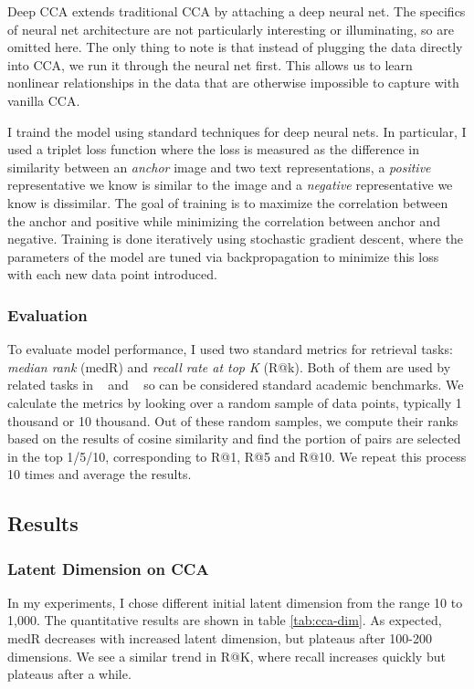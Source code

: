 \documentclass[12pt, titlepage]{article}
\begin{document}
Deep CCA extends traditional CCA by attaching a deep neural net. The specifics of neural net architecture are not particularly interesting or illuminating, so are omitted here. The only thing to note is that instead of plugging the data directly into CCA, we run it through the neural net first. This allows us to learn nonlinear relationships in the data that are otherwise impossible to capture with vanilla CCA.

I traind the model using standard techniques for deep neural nets. In particular, I used a triplet loss function where the loss is measured as the difference in similarity between an \textit{anchor} image and two text representations, a \textit{positive} representative we know is similar to the image and a \textit{negative} representative we know is dissimilar. The goal of training is to maximize the correlation between the anchor and positive while minimizing the correlation between anchor and negative. Training is done iteratively using stochastic gradient descent, where the parameters of the model are tuned via backpropagation to minimize this loss with each new data point introduced.

\subsubsection{Evaluation}
To evaluate model performance, I used two standard metrics for retrieval tasks: \textit{median rank} (medR) and \textit{recall rate at top K} (R@k). Both of them are used by related tasks in ~\cite{Recipe1M} and ~\cite{xmrs} so can be considered standard academic benchmarks. We calculate the metrics by looking over a random sample of data points, typically 1 thousand or 10 thousand. Out of these random samples, we compute their ranks based on the results of cosine similarity and find the portion of pairs are selected in the top 1/5/10, corresponding to R@1, R@5 and R@10. We repeat this process 10 times and average the results.

\subsection{Results}

\subsubsection{Latent Dimension on CCA}
In my experiments, I chose different initial latent dimension from the range 10 to 1,000. The quantitative results are shown in table \ref{tab:cca-dim}. As expected, medR decreases with increased latent dimension, but plateaus after 100-200 dimensions. We see a similar trend in R@K, where recall increases quickly but plateaus after a while.
\end{document}
